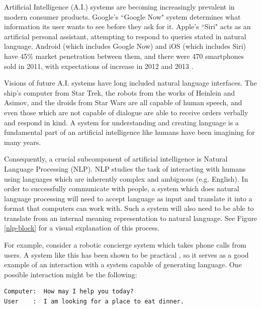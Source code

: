 Artificial Intelligence (A.I.) systems are becoming increasingly prevalent in
modern consumer products.  Google's ``Google Now" system determines
what information its user wants to see before they ask for it.  Apple's ``Siri"
acts as an artificial personal assistant, attempting to respond to queries stated in
natural language.  Android (which includes Google Now) and iOS (which
includes Siri) have 45\% market penetration between them, and there were
470 smartphones sold in 2011, with expectations of increase in 2012 and 2013
 \cite{smartphones}.

Visions of future A.I. systems have long included natural
language interfaces.  The ship's computer from Star Trek, the robots from
the works of Heinlein and Asimov, and the droids from Star Wars are
all capable of human speech, and even those which are not capable of dialogue
are able to receive orders verbally and respond in kind.  A system 
for understanding and creating language is a fundamental part of
an artificial intelligence like humans have been imagining for many years.

Consequently, a crucial subcomponent of artificial intelligence is Natural Language Processing (NLP).
NLP studies the task of interacting with humans using languages which are inherently
complex and ambiguous (e.g. English).
In order to successfully communicate with people, a system which does natural
language processing will need to accept language as input
and translate it into a format that computers can work with.  Such a system will also
need to be able to translate from an internal meaning representation to natural language.
See Figure \ref{nlp-block} for a visual explanation of this process.

For example, consider a robotic concierge system which takes phone calls from users.
A system like this has been shown to be practical \cite{litman_njfun_2000}, so it serves
as a good example of an interaction with a system capable of generating language.
One possible interaction might be the following:

\begin{verbatim}
Computer:  How may I help you today?
User    :  I am looking for a place to eat dinner.
\end{verbatim}

